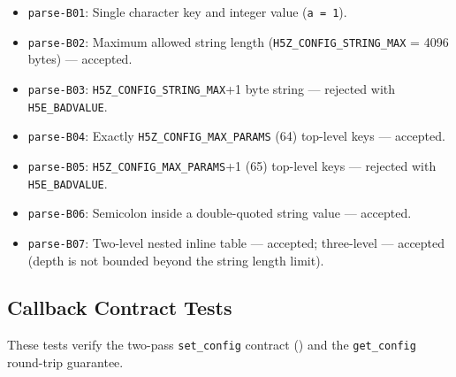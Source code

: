 \documentclass[../RFC-HDFG-2026-001.tex]{subfiles}
\begin{document}

\begin{itemize}
\item \texttt{parse-B01}: Single character key and integer value (\texttt{a = 1}).
\item \texttt{parse-B02}: Maximum allowed string length
  (\texttt{H5Z\_CONFIG\_STRING\_MAX} = 4096 bytes) --- accepted.
\item \texttt{parse-B03}: \texttt{H5Z\_CONFIG\_STRING\_MAX}+1 byte string --- rejected
  with \texttt{H5E\_BADVALUE}.
\item \texttt{parse-B04}: Exactly \texttt{H5Z\_CONFIG\_MAX\_PARAMS} (64) top-level keys ---
  accepted.
\item \texttt{parse-B05}: \texttt{H5Z\_CONFIG\_MAX\_PARAMS}+1 (65) top-level keys --- rejected
  with \texttt{H5E\_BADVALUE}.
\item \texttt{parse-B06}: Semicolon inside a double-quoted string value --- accepted.
\item \texttt{parse-B07}: Two-level nested inline table --- accepted; three-level --- accepted
  (depth is not bounded beyond the string length limit).
\end{itemize}


\subsection{Callback Contract Tests}
\label{sec:test-callbacks}

These tests verify the two-pass \texttt{set\_config} contract
() and the \texttt{get\_config} round-trip guarantee.
\end{document}
